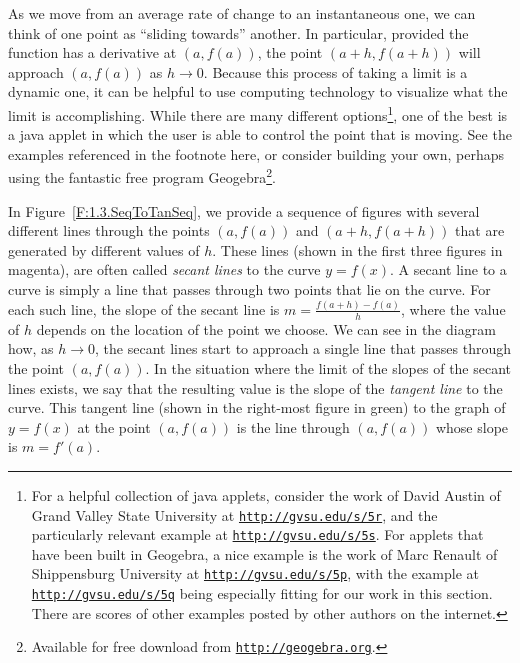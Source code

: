 As we move from an average rate of change to an instantaneous one, we can think of one point as ``sliding towards'' another.  In particular, provided the function has a derivative at $(a,f(a))$, the point $(a+h,f(a+h))$ will approach $(a,f(a))$ as $h \to 0$.  Because this process of taking a limit is a dynamic one, it can be helpful to use computing technology to visualize what the limit is accomplishing.  While there are many different options\footnote{For a helpful collection of java applets, consider the work of David Austin of Grand Valley State University at \href{http://gvsu.edu/s/5r}{\texttt{http://gvsu.edu/s/5r}}, and the particularly relevant example at \href{http://gvsu.edu/s/5s}{\texttt{http://gvsu.edu/s/5s}}.  For applets that have been built in Geogebra, a nice example is the work of Marc Renault of Shippensburg University at \href{http://gvsu.edu/s/5p}{\texttt{http://gvsu.edu/s/5p}}, with the example at \href{http://gvsu.edu/s/5q}{\texttt{http://gvsu.edu/s/5q}} being especially fitting for our work in this section.  There are scores of other examples posted by other authors on the internet.}, one of the best is a java applet in which the user is able to control the point that is moving.   See the examples referenced in the footnote here, or consider building your own, perhaps using the fantastic free program Geogebra\footnote{Available for free download from \href{http://geogebra.org}{\texttt{http://geogebra.org}}.}.

In Figure~\ref{F:1.3.SeqToTanSeq}, we provide a sequence of figures with several different lines through the points $(a, f(a))$ and $(a+h,f(a+h))$ that are generated by different values of $h$.  These lines (shown in the first three figures in magenta), are often called \emph{secant lines}  to the curve $y = f(x)$.  A secant line to a curve is simply a line that passes through two points that lie on the curve.  For each such line, the slope of the secant line is $m = \frac{f(a+h) - f(a)}{h}$, where the value of $h$ depends on the location of the point we choose.  We can see in the diagram how, as $h \to 0$, the secant lines start to approach a single line that passes through the point $(a,f(a))$.  In the situation where the limit of the slopes of the secant lines exists, we say that the resulting value is the slope of the \emph{tangent line} to the curve.  This tangent line (shown in the right-most figure in green) to the graph of $y = f(x)$ at the point $(a,f(a))$ is the line through $(a,f(a))$ whose slope is $m = f'(a)$.  

